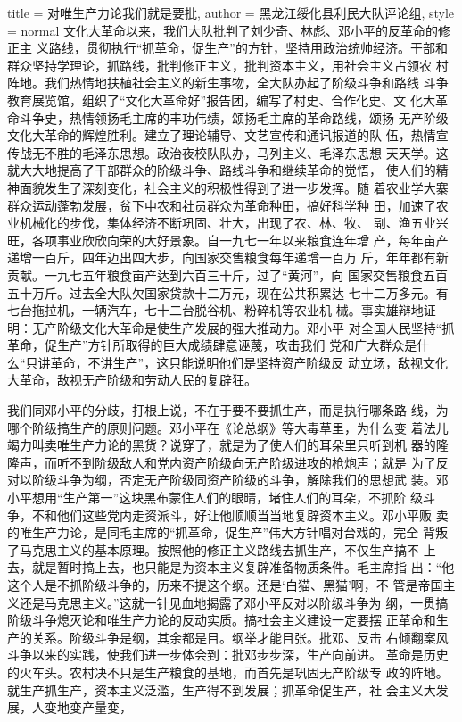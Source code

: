 \begin{hongqiarticle}{
        title  = {对唯生产力论我们就是要批},
        author = {黑龙江绥化县利民大队评论组},
        style  = normal
    }
    文化大革命以来，我们大队批判了刘少奇、林彪、邓小平的反革命的修正主
    义路线，贯彻执行“抓革命，促生产”的方针，坚持用政治统帅经济。干部和
    群众坚持学理论，抓路线，批判修正主义，批判资本主义，用社会主义占领农
    村阵地。我们热情地扶植社会主义的新生事物，全大队办起了阶级斗争和路线
    斗争教育展览馆，组织了“文化大革命好”报告团，编写了村史、合作化史、文
    化大革命斗争史，热情领扬毛主席的丰功伟绩，颂扬毛主席的革命路线，颂扬
    无产阶级文化大革命的辉煌胜利。建立了理论辅导、文艺宣传和通讯报道的队
    伍，热情宣传战无不胜的毛泽东思想。政治夜校队队办，马列主义、毛泽东思想
    天天学。这就大大地提高了干部群众的阶级斗争、路线斗争和继续革命的觉悟，
    使人们的精神面貌发生了深刻变化，社会主义的积极性得到了进一步发挥。随
    着农业学大寨群众运动蓬勃发展，贫下中农和社员群众为革命种田，搞好科学种
    田，加速了农业机械化的步伐，集体经济不断巩固、壮大，出现了农、林、牧、
    副、渔五业兴旺，各项事业欣欣向荣的大好景象。自一九七一年以来粮食连年增
    产，每年亩产递增一百斤，四年迈出四大步，向国家交售粮食每年递增一百万
    斤，年年都有新贡献。一九七五年粮食亩产达到六百三十斤，过了“黄河”，向
    国家交售粮食五百五十万斤。过去全大队欠国家贷款十二万元，现在公共积累达
    七十二万多元。有七台拖拉机，一辆汽车，七十二台脱谷机、粉碎机等农业机
    械。事实雄辩地证明：无产阶级文化大革命是使生产发展的强大推动力。邓小平
    对全国人民坚持“抓革命，促生产”方针所取得的巨大成绩肆意诬蔑，攻击我们
    党和广大群众是什么“只讲革命，不讲生产”，这只能说明他们是坚持资产阶级反
    动立场，敌视文化大革命，敌视无产阶级和劳动人民的复辟狂。

    我们同邓小平的分歧，打根上说，不在于要不要抓生产，而是执行哪条路
    线，为哪个阶级搞生产的原则问题。邓小平在《论总纲》等大毒草里，为什么变
    着法儿竭力叫卖唯生产力论的黑货？说穿了，就是为了使人们的耳朵里只听到机
    器的隆隆声，而听不到阶级敌人和党内资产阶级向无产阶级进攻的枪炮声；就是
    为了反对以阶级斗争为纲，否定无产阶级同资产阶级的斗争，解除我们的思想武
    装。邓小平想用“生产第一”这块黑布蒙住人们的眼晴，堵住人们的耳朵，不抓阶
    级斗争，不和他们这些党内走资派斗，好让他顺顺当当地复辟资本主义。邓小平贩
    卖的唯生产力论，是同毛主席的“抓革命，促生产”伟大方针唱对台戏的，完全
    背叛了马克思主义的基本原理。按照他的修正主义路线去抓生产，不仅生产搞不
    上去，就是暂时搞上去，也只能是为资本主义复辟准备物质条件。毛主席指
    出：“他这个人是不抓阶级斗争的，历来不提这个纲。还是‘白猫、黑猫’啊，不
    管是帝国主义还是马克思主义。”这就一针见血地揭露了邓小平反对以阶级斗争为
    纲，一贯搞阶级斗争熄灭论和唯生产力论的反动实质。搞社会主义建设一定要摆
    正革命和生产的关系。阶级斗争是纲，其余都是目。纲举才能目张。批邓、反击
    右倾翻案风斗争以来的实践，使我们进一步体会到：批邓步步深，生产向前进。
    革命是历史的火车头。农村决不只是生产粮食的基地，而首先是巩固无产阶级专
    政的阵地。就生产抓生产，资本主义泛滥，生产得不到发展；抓革命促生产，社
    会主义大发展，人变地变产量变，


\end{hongqiarticle}
